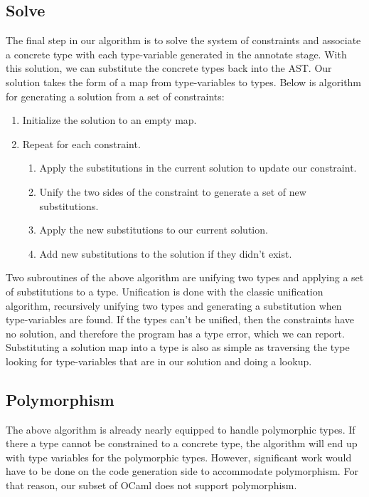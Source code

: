 \documentclass[12pt,a4paper,twoside,openright]{report}
\begin{document}
\subsection{Solve}
The final step in our algorithm is to solve the system of constraints and associate a concrete type with each type-variable generated in the annotate stage.
With this solution, we can substitute the concrete types back into the AST.
Our solution takes the form of a map from type-variables to types.
Below is algorithm for generating a solution from a set of constraints:
\begin{enumerate}
   \item Initialize the solution to an empty map.
   \item Repeat for each constraint.
      \begin{enumerate}[label=\roman*]
         \item Apply the substitutions in the current solution to update our constraint.
         \item Unify the two sides of the constraint to generate a set of new substitutions.
         \item Apply the new substitutions to our current solution.
         \item Add new substitutions to the solution if they didn't exist.
      \end{enumerate}
\end{enumerate}
Two subroutines of the above algorithm are unifying two types and applying a set of substitutions to a type.
Unification is done with the classic unification algorithm, recursively unifying two types and generating a substitution when type-variables are found.
If the types can't be unified, then the constraints have no solution, and therefore the program has a type error, which we can report.
Substituting a solution map into a type is also as simple as traversing the type looking for type-variables that are in our solution and doing a lookup.

\subsection{Polymorphism}
The above algorithm is already nearly equipped to handle polymorphic types.
If there a type cannot be constrained to a concrete type, the algorithm will end up with type variables for the polymorphic types.
However, significant work would have to be done on the code generation side to accommodate polymorphism.
For that reason, our subset of OCaml does not support polymorphism.
\end{document}

